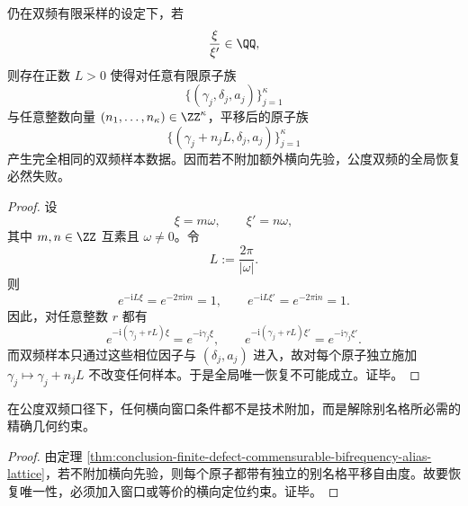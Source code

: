 \begin{theorem}[公度双频的不可去别名格]\label{thm:conclusion-finite-defect-commensurable-bifrequency-alias-lattice}
仍在双频有限采样的设定下，若
\[
\frac{\xi}{\xi'}\in\QQ,
\]
则存在正数 \(L>0\) 使得对任意有限原子族
\[
\{(\gamma_j,\delta_j,a_j)\}_{j=1}^{\kappa}
\]
与任意整数向量 \((n_1,\dots,n_\kappa)\in\ZZ^\kappa\)，平移后的原子族
\[
\{(\gamma_j+n_jL,\delta_j,a_j)\}_{j=1}^{\kappa}
\]
产生完全相同的双频样本数据。因而若不附加额外横向先验，公度双频的全局恢复必然失败。
\end{theorem}
\begin{proof}
设
\[
\xi=m\omega,
\qquad
\xi'=n\omega,
\]
其中 \(m,n\in\ZZ\) 互素且 \(\omega\neq 0\)。令
\[
L:=\frac{2\pi}{|\omega|}.
\]
则
\[
e^{-\mathrm{i}L\xi}=e^{-2\pi \mathrm{i}m}=1,
\qquad
e^{-\mathrm{i}L\xi'}=e^{-2\pi \mathrm{i}n}=1.
\]
因此，对任意整数 \(r\) 都有
\[
e^{-\mathrm{i}(\gamma_j+rL)\xi}=e^{-\mathrm{i}\gamma_j\xi},
\qquad
e^{-\mathrm{i}(\gamma_j+rL)\xi'}=e^{-\mathrm{i}\gamma_j\xi'}.
\]
而双频样本只通过这些相位因子与 \((\delta_j,a_j)\) 进入，故对每个原子独立施加 \(\gamma_j\mapsto\gamma_j+n_jL\) 不改变任何样本。于是全局唯一恢复不可能成立。证毕。
\end{proof}

\begin{corollary}[横向窗口阈值的几何必需性]\label{cor:conclusion-finite-defect-commensurable-window-threshold-necessity}
在公度双频口径下，任何横向窗口条件都不是技术附加，而是解除别名格所必需的精确几何约束。
\end{corollary}
\begin{proof}
由定理 \ref{thm:conclusion-finite-defect-commensurable-bifrequency-alias-lattice}，若不附加横向先验，则每个原子都带有独立的别名格平移自由度。故要恢复唯一性，必须加入窗口或等价的横向定位约束。证毕。
\end{proof}

\endinput
